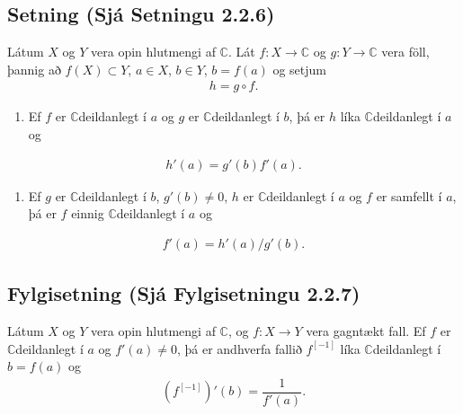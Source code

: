 \documentclass[a4paper,10pt,icelandic]{sphinxmanual}
\begin{document}
\subsection{Setning (Sjá Setningu 2.2.6)}
\label{\detokenize{Kafli02:setning-sja-setningu-2-2-6}}
Látum \(X\) og \(Y\) vera opin
hlutmengi af \({\mathbb{C}}\). Lát \(f:X\to {\mathbb{C}}\) og \(g:Y\to {\mathbb{C}}\) vera
föll, þannig að \(f(X)\subset Y\), \(a\in X\), \(b\in Y\),
\(b=f(a)\) og setjum
\begin{equation*}
\begin{split}h=g\circ f.\end{split}
\end{equation*}\begin{enumerate}
%
\item {} 
Ef \(f\) er \({\mathbb{C}}\)\textendash{}deildanlegt í \(a\) og \(g\) er \({\mathbb{C}}\)\textendash{}deildanlegt í \(b\), þá er \(h\) líka \({\mathbb{C}}\)\textendash{}deildanlegt í \(a\) og

\end{enumerate}
\begin{equation*}
\begin{split}h'(a)=g'(b)f'(a).\end{split}
\end{equation*}\begin{enumerate}
%
\setcounter{enumi}{1}
\item {} 
Ef \(g\) er \({\mathbb{C}}\)\textendash{}deildanlegt í \(b\), \(g'(b)\neq 0\), \(h\) er \({\mathbb{C}}\)\textendash{}deildanlegt í \(a\) og \(f\) er samfellt í \(a\), þá er \(f\) einnig \({\mathbb{C}}\)\textendash{}deildanlegt í \(a\) og

\end{enumerate}
\begin{equation*}
\begin{split}f'(a)=h'(a)/g'(b).\end{split}
\end{equation*}

\subsection{Fylgisetning (Sjá Fylgisetningu 2.2.7)}
\label{\detokenize{Kafli02:fylgisetning-sja-fylgisetningu-2-2-7}}
Látum \(X\) og \(Y\) vera opin hlutmengi af \({\mathbb{C}}\), og \(f:X\to Y\) vera gagntækt fall. Ef \(f\) er \({\mathbb{C}}\)\textendash{}deildanlegt í \(a\) og \(f'(a)\neq 0\), þá er andhverfa fallið \(f^{[-1]}\) líka \({\mathbb{C}}\)\textendash{}deildanlegt í \(b=f(a)\) og
\begin{equation*}
\begin{split}\left(f^{[-1]}\right)'(b)= \dfrac 1{f'(a)}.\label{4.2.4}\end{split}
\end{equation*}
\end{document}
